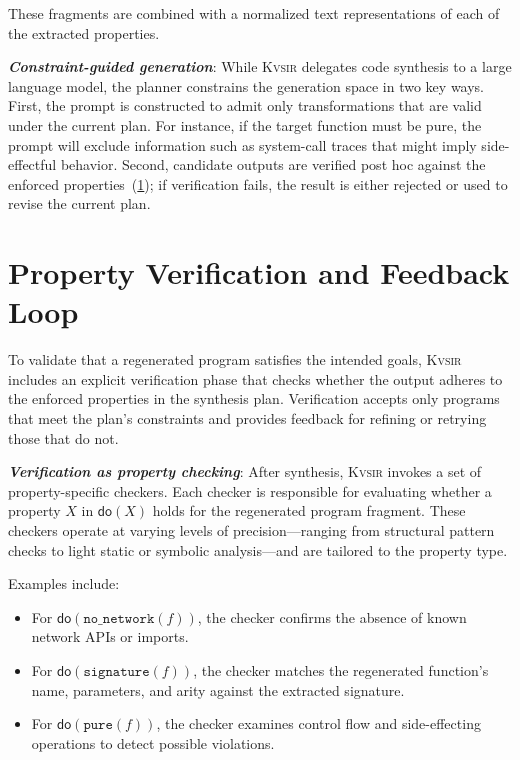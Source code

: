 \documentclass[sigplan]{acmart}
\newcommand{\sys}{{\scshape Kv{\textalpha}sir}\xspace}
\newcommand{\heading}[1]{\vspace{2pt}\noindent\textbf{\emph{#1}}:\enspace}
\begin{document}
These fragments are combined with a normalized text representations of each of 
the extracted properties.

\heading{Constraint-guided generation}
While \sys delegates code synthesis to a large language model, the planner constrains the generation space in two key ways.
First, the prompt is constructed to admit only transformations that are valid under the current plan.
For instance, if the target function must be pure, the prompt will exclude information such as system-call traces that might imply side-effectful behavior.
Second, candidate outputs are verified post hoc against the enforced properties~(\cref{sec:verification}); if verification fails, the result is either rejected or used to revise the current plan.


\section{Property Verification and Feedback Loop}
\label{sec:verification}

To validate that a regenerated program satisfies the intended goals, \sys includes an explicit verification phase that checks whether the output adheres to the enforced properties in the synthesis plan. 
Verification accepts only programs that meet the plan's constraints and provides feedback for refining or retrying those that do not.

\heading{Verification as property checking}
After synthesis, \sys invokes a set of property-specific checkers. Each checker is responsible for evaluating whether a property $X$ in $\mathsf{do}(X)$ holds for the regenerated program fragment. These checkers operate at varying levels of precision---ranging from structural pattern checks to light static or symbolic analysis---and are tailored to the property type.

Examples include:
\begin{itemize}
  \item For $\mathsf{do}(\texttt{no\_network}(f))$, the checker confirms the absence of known network APIs or imports.
  \item For $\mathsf{do}(\texttt{signature}(f))$, the checker matches the regenerated function's name, parameters, and arity against the extracted signature.
  \item For $\mathsf{do}(\texttt{pure}(f))$, the checker examines control flow and side-effecting operations to detect possible violations.
\end{itemize}
\end{document}
